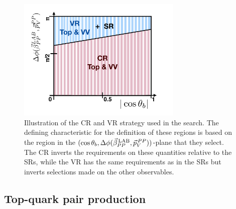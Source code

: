 \begin{figure}[!htb]
    \begin{center}
        \includegraphics[width=0.7\textwidth]{figures/search_stop2l/bkg_est/crvrmotivation}
        \caption{
            Illustration of the CR and VR strategy used in the \bWN search.
            The defining characteristic for the definition of these regions is
            based on the region in the $(\cos\theta_b, \Delta \phi (\vec{\beta}_{PP}^{\,\text{LAB}}, \vec{p}_V^{\,PP}))$-plane that they select.
            The CR inverts the requirements on these quantities relative to the SRs,
            while the VR has the same requirements as in the SRs but inverts
            selections made on the other observables.
        }
        \label{fig:stop_crvr_motivation}
    \end{center}
\end{figure}

%
%

\subsection{Top-quark pair production}
\label{sec:stop_ttbar_estimate}

